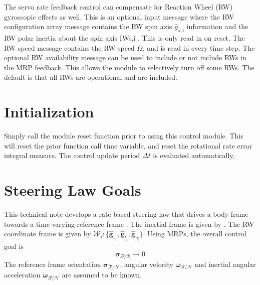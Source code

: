 \documentclass[]{BasiliskReportMemo}
\begin{document}
The servo rate feedback control can compensate for Reaction Wheel (RW) gyroscopic effects as well. This is an optional input message where the RW configuration array message contains the RW spin axis $\hat{g}_{s,i}$ information and the RW polar inertia about the spin axis IWs,i . This is only read in on reset. The RW speed message contains the RW speed $\Omega_i$ and is read in every time step. The optional RW availability message can be used to include or not include RWs in the MRP feedback. This allows the module to selectively turn off some RWs. The default is that all RWs are operational and are included.

\section{Initialization}
Simply call the module reset function prior to using this control module.  This will reset the prior function call time variable, and reset the rotational rate error integral measure.  The control update period $\Delta t$ is evaluated automatically.


\section{Steering Law Goals}
This technical note develops a rate based steering law that drives a body frame  towards a time varying reference frame . The inertial frame is given by .   The RW coordinate frame is given by $\mathcal{W_{i}}:\{ \hat{\bm g}_{s_{i}}, \hat{\bm g}_{t_{i}}, \hat{\bm g}_{g_{i}} \}$.  Using MRPs, the overall control goal is
\begin{equation}
	\label{eq:MS:1}
	\bm\sigma_{\mathcal{B}/\mathcal{R}} \rightarrow 0
\end{equation}
The reference frame orientation $\bm \sigma_{\mathcal{R}/\mathcal{N}}$, angular velocity $\bm\omega_{\mathcal{R}/\mathcal{N}}$ and inertial angular acceleration $\dot{\bm \omega}_{\mathcal{R}/\mathcal{N}}$ are assumed to be known.
\end{document}
